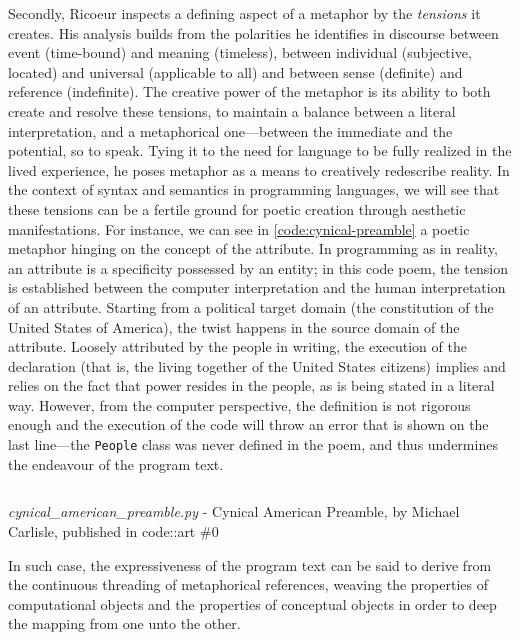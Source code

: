 Secondly, Ricoeur inspects a defining aspect of a metaphor by the \emph{tensions} it creates. His analysis builds from the polarities he identifies in discourse between event (time-bound) and meaning (timeless), between individual (subjective, located) and universal (applicable to all) and between sense (definite) and reference (indefinite). The creative power of the metaphor is its ability to both create and resolve these tensions, to maintain a balance between a literal interpretation, and a metaphorical one—between the immediate and the potential, so to speak. Tying it to the need for language to be fully realized in the lived experience, he poses metaphor as a means to creatively redescribe reality. In the context of syntax and semantics in programming languages, we will see that these tensions can be a fertile ground for poetic creation through aesthetic manifestations. For instance, we can see in \autoref{code:cynical-preamble} a poetic metaphor hinging on the concept of the attribute. In programming as in reality, an attribute is a specificity possessed by an entity; in this code poem, the tension is established between the computer interpretation and the human interpretation of an attribute. Starting from a political target domain (the constitution of the United States of America), the twist happens in the source domain of the attribute. Loosely attributed by the people in writing, the execution of the declaration (that is, the living together of the United States citizens) implies and relies on the fact that power resides in the people, as is being stated in a literal way. However, from the computer perspective, the definition is not rigorous enough and the execution of the code will throw an error that is shown on the last line—the \lstinline{People} class was never defined in the poem, and thus undermines the endeavour of the program text.

\begin{listing}
    \inputminted[]{python}{./corpus/cynical_american_preamble.py}
    \caption{\emph{cynical\_american\_preamble.py} - Cynical American Preamble, by Michael Carlisle, published in code::art \#0 \citep{brand_code_2019}}
    \label{code:cynical-preamble}
\end{listing}

In such case, the expressiveness of the program text can be said to derive from the continuous threading of metaphorical references, weaving the properties of computational objects and the properties of conceptual objects in order to deep the mapping from one unto the other.

